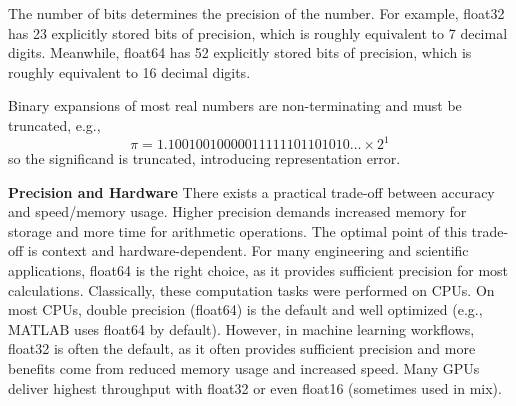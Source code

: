 The number of bits determines the precision of the number.
For example, float32 has 23 explicitly stored bits of precision, which is roughly equivalent to 7 decimal digits.
Meanwhile, float64 has 52 explicitly stored bits of precision, which is roughly equivalent to 16 decimal digits.





Binary expansions of most real numbers are non-terminating and must be truncated, e.g.,
\[ \pi = 1.10010010000011111101101010\ldots \times 2^{1} \]
so the significand is truncated, introducing representation error.

\textbf{Precision and Hardware}\quad
There exists a practical trade-off between accuracy and speed/memory usage.
Higher precision demands increased memory for storage and more time for arithmetic operations.
The optimal point of this trade-off is context and hardware-dependent.
For many engineering and scientific applications, float64 is the right choice, as it provides sufficient precision for most calculations.
Classically, these computation tasks were performed on CPUs.
On most CPUs, double precision (float64) is the default and well optimized (e.g., MATLAB uses float64 by default).
However, in machine learning workflows, float32 is often the default, as it often provides sufficient precision and more benefits come from reduced memory usage and increased speed.
Many GPUs deliver highest throughput with float32 or even float16 (sometimes used in mix).

